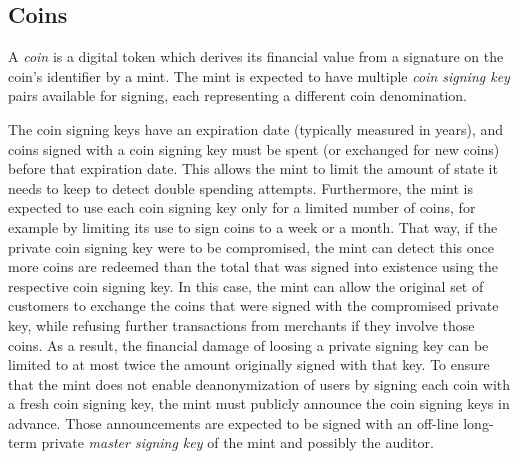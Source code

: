 \documentclass{llncs}
\begin{document}


\subsection{Coins}

A \emph{coin} is a digital token which derives its financial value
from a signature on the coin's identifier by a mint.  The mint is
expected to have multiple {\em coin signing key} pairs available for
signing, each representing a different coin denomination.

The coin signing keys have an expiration date (typically measured in
years), and coins signed with a coin signing key must be spent (or
exchanged for new coins) before that expiration date.  This allows the
mint to limit the amount of state it needs to keep to detect
double spending attempts.  Furthermore, the mint is expected to use each coin
signing key only for a limited number of coins, for example by
limiting its use to sign coins to a week or a month.  That way, if the
private coin signing key were to be compromised, the mint can detect
this once more coins are redeemed than the total that was signed into
existence using the respective coin signing key.  In this case, the
mint can allow the original set of customers to exchange the coins
that were signed with the compromised private key, while refusing
further transactions from merchants if they involve those coins.  As a
result, the financial damage of loosing a private signing key can be
limited to at most twice the amount originally signed with that key.
To ensure that the mint does not enable deanonymization of users by
signing each coin with a fresh coin signing key, the mint must
publicly announce the coin signing keys in advance.  Those
announcements are expected to be signed with an off-line long-term
private {\em master signing key} of the mint and possibly the auditor.
\end{document}
